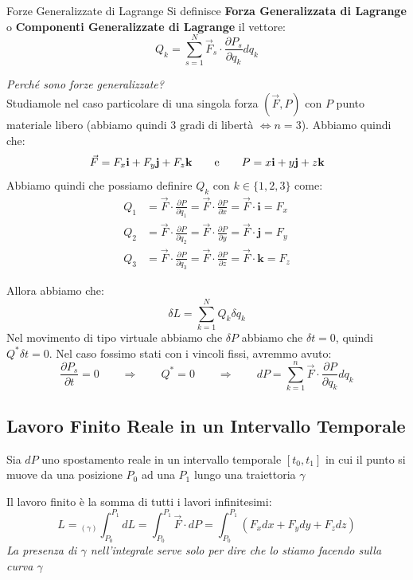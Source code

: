 \documentclass[11pt,a4paper,twoside]{article}
\theoremstyle{definition}
\begin{document}
\begin{defn}{Forze Generalizzate di Lagrange}{}\label{Qk}
	Si definisce \textbf{Forza Generalizzata di Lagrange} o \textbf{Componenti Generalizzate di Lagrange} il vettore:
	\[ Q_k = \sum_{s = 1}^N \vec F_s \cdot \frac{\partial P_s}{\partial q_k}dq_k \]
\end{defn}

\textit{Perché sono forze generalizzate?}\\
Studiamole nel caso particolare di una singola forza $(\vec F, P)$ con $P$ punto materiale libero (abbiamo quindi $3$ gradi di libertà $\Leftrightarrow n=3$). Abbiamo quindi che:
\[ \vec F = F_x \mathbf i + F_y \mathbf j + F_z \mathbf k \qquad \text e \qquad P = x\mathbf i+ y \mathbf j + z \mathbf k \]
Abbiamo quindi che possiamo definire $Q_k$ con $k \in \{1,2,3\}$ come:
\begin{align*}
	Q_1 &= \vec F \cdot \frac{\partial P}{\partial q_1}= \vec F \cdot \frac{\partial P}{\partial x} = \vec F \cdot \mathbf i = F_x\\
	Q_2 &= \vec F \cdot \frac{\partial P}{\partial q_2}= \vec F \cdot \frac{\partial P}{\partial y} = \vec F \cdot \mathbf j = F_y\\
	Q_3 &= \vec F \cdot \frac{\partial P}{\partial q_3}= \vec F \cdot \frac{\partial P}{\partial z} = \vec F \cdot \mathbf k = F_z
\end{align*}

Allora abbiamo che:
\[ \delta L = \sum_{k = 1}^N Q_k \delta q_k \]
Nel movimento di tipo virtuale abbiamo che $\delta P$ abbiamo che $\delta t = 0$, quindi $Q^*\delta t = 0$. Nel caso fossimo stati con i vincoli fissi, avremmo avuto:
\[\frac{\partial P_s}{\partial t} = 0\qquad\Rightarrow \qquad Q^* = 0 \qquad \Rightarrow \qquad dP = \sum_{k = 1}^n \vec F \cdot \frac{\partial P}{\partial q_k} dq_k\]

\subsection{Lavoro Finito Reale in un Intervallo Temporale}

Sia $dP$ uno spostamento reale in un intervallo temporale $[t_0, t_1]$ in cui il punto si muove da una posizione $P_0$ ad una $P_1$ lungo una traiettoria $\gamma$
\begin{center}
\end{center}
Il lavoro finito è la somma di tutti i lavori infinitesimi:
\[ L = \left._{(\gamma)} \int_{P_0}^{P_1}dL \right. = \int_{P_0}^{P_1} \vec F \cdot dP = \int_{P_0}^{P_1}(F_xdx + F_ydy + F_zdz)\]
\textit{La presenza di $\gamma$ nell'integrale serve solo per dire che lo stiamo facendo sulla curva $\gamma$}
\end{document}
